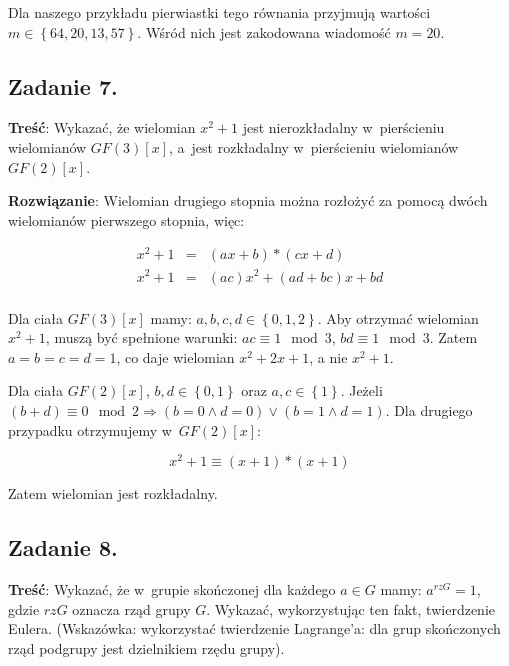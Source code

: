 \documentclass[a4paper,10pt, twocolumn]{article}
\begin{document}
\noindent Dla naszego przykładu pierwiastki tego równania przyjmują wartości $m \in \left\{ 64, 20, 13, 57 \right\}$. Wśród nich jest zakodowana wiadomość $m = 20$.

\subsection{Zadanie 7.}

\textbf{Treść}: Wykazać, że wielomian $x^{2} + 1$ jest nierozkładalny w~pierścieniu wielomianów $GF(3)[x]$, a~jest rozkładalny w~pierścieniu wielomianów $GF(2)[x]$.

\textbf{Rozwiązanie}: Wielomian drugiego stopnia można rozłożyć za pomocą dwóch wielomianów pierwszego stopnia, więc:

\begin{equation*}
 \begin{array}{lcl} x^{2} + 1 & = & (ax + b) * (cx + d) \\ x^{2} + 1 & = & (ac)x^{2} + (ad + bc)x + bd \\ \end{array}
\end{equation*}

Dla ciała $GF(3)[x]$ mamy:
$a, b, c, d \in \left\{0, 1, 2\right\}$.
Aby otrzymać wielomian $x^2 + 1$, muszą być spełnione warunki:
$ac \equiv 1 \mod 3$,
$bd \equiv 1 \mod 3$.
Zatem $a = b = c = d = 1$, co daje wielomian $x^2 + 2x + 1$, a nie $x^2 + 1$.

Dla ciała $GF(2)[x]$, $b, d \in \left\{0, 1\right\}$ oraz $a, c \in \left\{1\right\}$. Jeżeli $(b + d) \equiv 0 \mod 2 \Rightarrow (b = 0 \wedge d = 0) \vee (b = 1 \wedge d = 1)$. Dla drugiego przypadku otrzymujemy w~$GF(2)[x]$:

\begin{equation*}
 x^{2} + 1 \equiv (x+1) * (x+1)
\end{equation*}

Zatem wielomian jest rozkładalny.

\subsection{Zadanie 8.}

\textbf{Treść}: Wykazać, że w~grupie skończonej dla każdego $a \in G$ mamy: $a^{rzG} = 1$, gdzie $rzG$ oznacza rząd grupy $G$. Wykazać, wykorzystując ten fakt, twierdzenie Eulera. (Wskazówka: wykorzystać twierdzenie Lagrange'a: dla grup skończonych rząd podgrupy jest dzielnikiem rzędu grupy).
\end{document}
